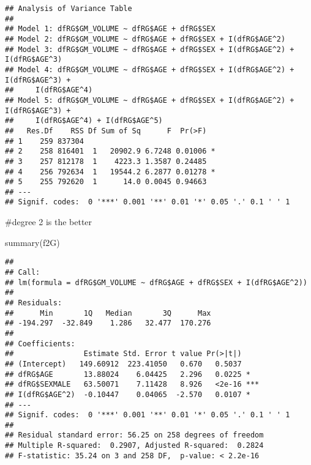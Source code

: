 \documentclass[
]{article}
\newenvironment{Shaded}{\begin{snugshade}}{\end{snugshade}}
\newcommand{\DecValTok}[1]{\textcolor[rgb]{0.00,0.00,0.81}{#1}}
\newcommand{\FunctionTok}[1]{\textcolor[rgb]{0.00,0.00,0.00}{#1}}
\newcommand{\NormalTok}[1]{#1}
\newcommand{\OtherTok}[1]{\textcolor[rgb]{0.56,0.35,0.01}{#1}}
\newcommand{\SpecialCharTok}[1]{\textcolor[rgb]{0.00,0.00,0.00}{#1}}
\begin{document}
\begin{Shaded}
\end{Shaded}

\begin{verbatim}
## Analysis of Variance Table
## 
## Model 1: dfRG$GM_VOLUME ~ dfRG$AGE + dfRG$SEX
## Model 2: dfRG$GM_VOLUME ~ dfRG$AGE + dfRG$SEX + I(dfRG$AGE^2)
## Model 3: dfRG$GM_VOLUME ~ dfRG$AGE + dfRG$SEX + I(dfRG$AGE^2) + I(dfRG$AGE^3)
## Model 4: dfRG$GM_VOLUME ~ dfRG$AGE + dfRG$SEX + I(dfRG$AGE^2) + I(dfRG$AGE^3) + 
##     I(dfRG$AGE^4)
## Model 5: dfRG$GM_VOLUME ~ dfRG$AGE + dfRG$SEX + I(dfRG$AGE^2) + I(dfRG$AGE^3) + 
##     I(dfRG$AGE^4) + I(dfRG$AGE^5)
##   Res.Df    RSS Df Sum of Sq      F  Pr(>F)  
## 1    259 837304                              
## 2    258 816401  1   20902.9 6.7248 0.01006 *
## 3    257 812178  1    4223.3 1.3587 0.24485  
## 4    256 792634  1   19544.2 6.2877 0.01278 *
## 5    255 792620  1      14.0 0.0045 0.94663  
## ---
## Signif. codes:  0 '***' 0.001 '**' 0.01 '*' 0.05 '.' 0.1 ' ' 1
\end{verbatim}

\#degree 2 is the better

\begin{Shaded}
\begin{Highlighting}[]
\FunctionTok{summary}\NormalTok{(f2G) }
\end{Highlighting}
\end{Shaded}

\begin{verbatim}
## 
## Call:
## lm(formula = dfRG$GM_VOLUME ~ dfRG$AGE + dfRG$SEX + I(dfRG$AGE^2))
## 
## Residuals:
##      Min       1Q   Median       3Q      Max 
## -194.297  -32.849    1.286   32.477  170.276 
## 
## Coefficients:
##                Estimate Std. Error t value Pr(>|t|)    
## (Intercept)   149.60912  223.41050   0.670   0.5037    
## dfRG$AGE       13.88024    6.04425   2.296   0.0225 *  
## dfRG$SEXMALE   63.50071    7.11428   8.926   <2e-16 ***
## I(dfRG$AGE^2)  -0.10447    0.04065  -2.570   0.0107 *  
## ---
## Signif. codes:  0 '***' 0.001 '**' 0.01 '*' 0.05 '.' 0.1 ' ' 1
## 
## Residual standard error: 56.25 on 258 degrees of freedom
## Multiple R-squared:  0.2907, Adjusted R-squared:  0.2824 
## F-statistic: 35.24 on 3 and 258 DF,  p-value: < 2.2e-16
\end{verbatim}
\end{document}
